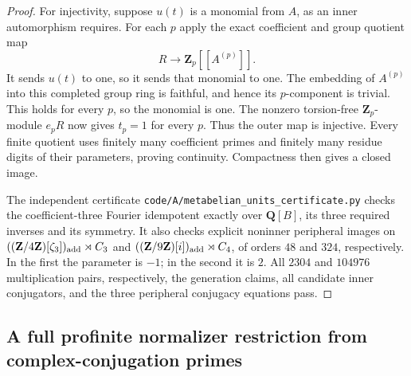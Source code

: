 \documentclass[11pt,oneside]{article}
\begin{document}
\begin{proof}
For injectivity, suppose $u(t)$ is a monomial from
$A$, as an inner automorphism requires. For each $p$
apply the exact coefficient and group quotient map
\[
 R\longrightarrow\mathbf Z_p[[A^{(p)}]].
\]
It sends $u(t)$ to one, so it sends that monomial to
one. The embedding of $A^{(p)}$ into this completed
group ring is faithful, and hence its $p$-component
is trivial. This holds for every $p$, so the monomial
is one. The nonzero torsion-free $\mathbf Z_p$-module
$e_pR$ now gives $t_p=1$ for every $p$. Thus the outer
map is injective. Every finite quotient uses finitely
many coefficient primes and finitely many residue
digits of their parameters, proving continuity.
Compactness then gives a closed image.

The independent certificate
\texttt{code/A/metabelian\_units\_certificate.py}
checks the coefficient-three Fourier idempotent
exactly over $\mathbf Q[B]$, its three required
inverses and its symmetry. It also checks explicit
noninner peripheral images on
$((\mathbf Z/4\mathbf Z)[\zeta_3])_{\rm add}\rtimes C_3$
and $((\mathbf Z/9\mathbf Z)[i])_{\rm add}\rtimes C_4$,
of orders $48$ and $324$, respectively. In the first
the parameter is $-1$; in the second it is $2$.
All $2304$ and $104976$ multiplication pairs, respectively,
the generation claims, all candidate inner conjugators,
and the three peripheral conjugacy equations pass.
\end{proof}

\subsection{A full profinite normalizer restriction from complex-conjugation primes}
\end{document}
